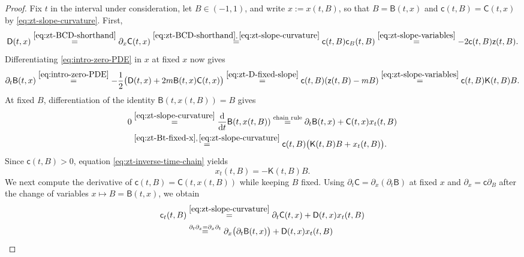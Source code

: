 \documentclass[10pt]{amsart}
\theoremstyle{definition}
\theoremstyle{remark}
\numberwithin{equation}{section}
\newcommand{\1}{\mathbf 1}
\newcommand{\stackref}[2]{\stackrel{#2}{#1}}
\begin{document}
\begin{proof}
Fix $t$ in the interval under consideration, let $B\in(-1,1)$, and write $x:=x(t,B)$, so that $B=\mathsf B(t,x)$ and $\mathsf c(t,B)=\mathsf C(t,x)$ by \eqref{eq:zt-slope-curvature}. First,
\begin{equation}
 \mathsf D(t,x)
 \stackref{=}{\eqref{eq:zt-BCD-shorthand}}
 \partial_x\mathsf C(t,x)
 \stackref{=}{\eqref{eq:zt-BCD-shorthand},\,\eqref{eq:zt-slope-curvature}}
 \mathsf c(t,B)\mathsf c_B(t,B)
 \stackref{=}{\eqref{eq:zt-slope-variables}}
 -2\mathsf c(t,B)\mathsf z(t,B).
 \label{eq:zt-D-fixed-slope}
\end{equation}
Differentiating \eqref{eq:intro-zero-PDE} in $x$ at fixed $x$ now gives
\begin{equation}
 \partial_t\mathsf B(t,x)
 \stackref{=}{\eqref{eq:intro-zero-PDE}}
 -\frac12\bigl(\mathsf D(t,x)+2m\mathsf B(t,x)\mathsf C(t,x)\bigr)
 \stackref{=}{\eqref{eq:zt-D-fixed-slope}}
 \mathsf c(t,B)(\mathsf z(t,B)-mB)
 \stackref{=}{\eqref{eq:zt-slope-variables}}
 \mathsf c(t,B)\mathsf K(t,B)B.
 \label{eq:zt-Bt-fixed-x}
\end{equation}
At fixed $B$, differentiation of the identity $\mathsf B(t,x(t,B))=B$ gives
\begin{align}
 0
 &\stackref{=}{\eqref{eq:zt-slope-curvature}}
 \frac{\mathrm d}{\mathrm d t}\mathsf B(t,x(t,B))
 \stackref{=}{\text{chain rule}}
 \partial_t\mathsf B(t,x)+\mathsf C(t,x)x_t(t,B)\notag\\
 &\stackref{=}{\eqref{eq:zt-Bt-fixed-x},\,\eqref{eq:zt-slope-curvature}}
 \mathsf c(t,B)\bigl(\mathsf K(t,B)B+x_t(t,B)\bigr).
 \label{eq:zt-inverse-time-chain}
\end{align}
Since $\mathsf c(t,B)>0$, equation \eqref{eq:zt-inverse-time-chain} yields
\begin{equation}
 x_t(t,B)=-\mathsf K(t,B)B.
 \label{eq:zt-xt-fixed-B}
\end{equation}
We next compute the derivative of $\mathsf c(t,B)=\mathsf C(t,x(t,B))$ while keeping $B$ fixed. Using $\partial_t\mathsf C=\partial_x(\partial_t\mathsf B)$ at fixed $x$ and $\partial_x=\mathsf c\partial_B$ after the change of variables $x\mapsto B=\mathsf B(t,x)$, we obtain
\begin{align}
 \mathsf c_t(t,B)
 &\stackref{=}{\eqref{eq:zt-slope-curvature}}
 \partial_t\mathsf C(t,x)+\mathsf D(t,x)x_t(t,B)\notag\\
 &\stackref{=}{\partial_t\partial_x=\partial_x\partial_t}
 \partial_x\bigl(\partial_t\mathsf B(t,x)\bigr)+\mathsf D(t,x)x_t(t,B)\notag\\

\end{align}
\end{proof}
\end{document}
